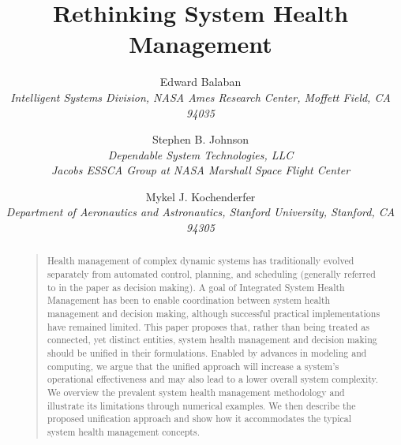 \documentclass[letterpaper]{article}
\theoremstyle{example}
\newcounter{examples}
\begin{document}
\title{Rethinking System Health Management}

\author{
  Edward Balaban \\
    {\normalsize\itshape
    Intelligent Systems Division, NASA Ames Research Center, Moffett Field, CA 94035}\\
		\and
	 Stephen B. Johnson \\
		{\normalsize\itshape
   Dependable System Technologies, LLC} \\
		{\normalsize\itshape
   Jacobs ESSCA Group at NASA Marshall Space Flight Center} \\
		\and
	 Mykel J. Kochenderfer \\
		{\normalsize\itshape
		Department of Aeronautics and Astronautics, Stanford University, Stanford, CA 94305} \\
	}
\date{}
\maketitle
\begin{abstract}
\begin{quote}
Health management of complex dynamic systems has traditionally evolved separately from automated control, planning, and scheduling (generally referred to in the paper as decision making). A goal of Integrated System Health Management has been to enable coordination between system health management and decision making, although successful practical implementations have remained limited. This paper proposes that, rather than being treated as connected, yet distinct entities, system health management and decision making should be unified in their formulations. Enabled by advances in modeling and computing, we argue that the unified approach will increase a system's operational effectiveness and may also lead to a lower overall system complexity. We overview the prevalent system health management methodology and illustrate its limitations through numerical examples. We then describe the proposed unification approach and show how it accommodates the typical system health management concepts.
\end{quote}
\end{abstract}







\clearpage
\fontsize{9.0pt}{10.0pt} \selectfont


\end{document}
